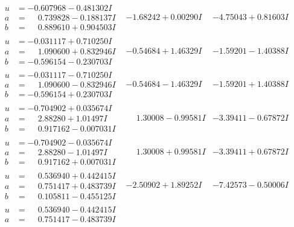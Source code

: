\documentclass[1p]{elsarticle_modified}
\theoremstyle{definition}
\begin{document}
$$\begin{array}{c|c|c}
 \hline 
\begin{aligned}
u &= -0.607968 - 0.481302 I \\
a &= \phantom{-}0.739828 - 0.188137 I \\
b &= \phantom{-}0.889610 + 0.904503 I\end{aligned}
 & -1.68242 + 0.00290 I & -4.75043 + 0.81603 I \\ \hline\begin{aligned}
u &= -0.031117 + 0.710250 I \\
a &= \phantom{-}1.090600 + 0.832946 I \\
b &= -0.596154 - 0.230703 I\end{aligned}
 & -0.54684 + 1.46329 I & -1.59201 - 1.40388 I \\ \hline\begin{aligned}
u &= -0.031117 - 0.710250 I \\
a &= \phantom{-}1.090600 - 0.832946 I \\
b &= -0.596154 + 0.230703 I\end{aligned}
 & -0.54684 - 1.46329 I & -1.59201 + 1.40388 I \\ \hline\begin{aligned}
u &= -0.704902 + 0.035674 I \\
a &= \phantom{-}2.88280 + 1.01497 I \\
b &= \phantom{-}0.917162 - 0.007031 I\end{aligned}
 & \phantom{-}1.30008 - 0.99581 I & -3.39411 - 0.67872 I \\ \hline\begin{aligned}
u &= -0.704902 - 0.035674 I \\
a &= \phantom{-}2.88280 - 1.01497 I \\
b &= \phantom{-}0.917162 + 0.007031 I\end{aligned}
 & \phantom{-}1.30008 + 0.99581 I & -3.39411 + 0.67872 I \\ \hline\begin{aligned}
u &= \phantom{-}0.536940 + 0.442415 I \\
a &= \phantom{-}0.751417 + 0.483739 I \\
b &= \phantom{-}0.105811 - 0.455125 I\end{aligned}
 & -2.50902 + 1.89252 I & -7.42573 - 0.50006 I \\ \hline\begin{aligned}
u &= \phantom{-}0.536940 - 0.442415 I \\
a &= \phantom{-}0.751417 - 0.483739 I \\

\end{aligned}
\end{array}$$
\end{document}
